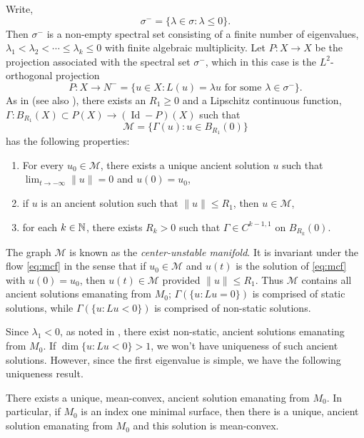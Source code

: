 \documentclass{amsart}
\begin{document}
Write,
\[
\sigma^- = \{\lambda \in \sigma : \lambda \leq 0\}.
\]
Then \(\sigma^-\) is a non-empty spectral set consisting of a finite number of eigenvalues, \(\lambda_1 < \lambda_2 < \cdots \leq \lambda_k \leq 0\) with finite algebraic multiplicity. Let \(P: X \to X\) be the projection associated with the spectral set \(\sigma^-\), which in this case is the \(L^2\)-orthogonal projection
\[
P : X \to N^- = \{u \in X : L(u) = \lambda u \text{ for some } \lambda \in \sigma^-\}.
\]
As in \cite[Theorem 4.1]{Simonett:/1995} (see also \cite[Theorem 9.2.2]{lunardi2012analytic}), there exists an \(R_1 \geq 0\) and a Lipschitz continuous function, \(\Gamma : B_{R_1}(X) \subset P(X) \to (\operatorname{Id} - P)(X)\) such that
\[
\mathcal{M} = \{\Gamma(u) : u \in B_{R_1}(0)\}
\]
has the following properties:
\begin{enumerate}
\item For every \(u_0 \in \mathcal{M}\), there exists a unique ancient solution \(u\) such that \(\lim_{t\to-\infty} \|u\| = 0\) and \(u(0) = u_0\),
\item if \(u\) is an ancient solution such that \(\|u\| \leq R_1\), then \(u \in \mathcal{M}\),
\item for each \(k \in \mathbb{N}\), there exists \(R_k > 0\) such that \(\Gamma \in C^{k-1,1}\) on \(B_{R_k}(0)\).
\end{enumerate}

The graph \(\mathcal{M}\) is known as the \emph{center-unstable manifold}. It is invariant under the flow \eqref{eq:mcf} in the sense that if \(u_0 \in \mathcal{M}\) and \(u(t)\) is the solution of \eqref{eq:mcf} with \(u(0) = u_0\), then \(u(t) \in \mathcal{M}\) provided \(\|u\| \leq R_1\). Thus \(\mathcal{M}\) contains all ancient solutions emanating from \(M_0\); \(\Gamma(\{u : Lu = 0\})\) is comprised of static solutions, while \(\Gamma(\{u : Lu < 0\})\) is comprised of non-static solutions.

Since \(\lambda_1 < 0\), as noted in , there exist non-static, ancient solutions emanating from \(M_0\). If \(\dim \{u : L u < 0\} > 1\), we won't have uniqueness of such ancient solutions. However, since the first eigenvalue is simple, we have the following uniqueness result.

\begin{thm}
\label{thm:ancient_meanconvex_uniqueness}
There exists a unique, mean-convex, ancient solution emanating from \(M_0\). In particular, if \(M_0\) is an index one minimal surface, then there is a unique, ancient solution emanating from \(M_0\) and this solution is mean-convex.
\end{thm}
\end{document}
